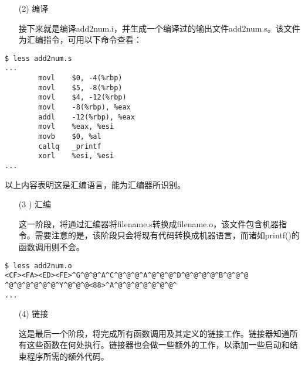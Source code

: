 \begin{frame}[fragile]\ft{\secname}
\begin{itemize}
\item[(2)] 编译
\item[] 接下来就是编译{\ttfamily add2num.i}，并生成一个编译过的输出文件{\ttfamily add2num.s}。该文件为汇编指令，可用以下命令查看：
\end{itemize}
\end{frame}


\begin{frame}[fragile]\ft{\secname}
\begin{lstlisting}[basicstyle=\ttfamily\footnotesize,backgroundcolor=\color{red!10}]
$ less add2num.s
...
        movl    $0, -4(%rbp)
        movl    $5, -8(%rbp)
        movl    $4, -12(%rbp)
        movl    -8(%rbp), %eax
        addl    -12(%rbp), %eax
        movl    %eax, %esi
        movb    $0, %al
        callq   _printf
        xorl    %esi, %esi
...      
\end{lstlisting}
以上内容表明这是汇编语言，能为汇编器所识别。
\end{frame}


\begin{frame}[fragile]\ft{\secname}
\begin{itemize}
\item[(3 )] 汇编
\item[] 这一阶段，将通过汇编器将{\ttfamily filename.s}转换成{\ttfamily filename.o}，该文件包含机器指令。需要注意的是，该阶段只会将现有代码转换成机器语言，而诸如{\ttfamily printf()}的函数调用则不会。
\end{itemize}
\end{frame}


\begin{frame}[fragile]\ft{\secname}
\begin{lstlisting}[backgroundcolor=\color{red!10}]
$ less add2num.o
<CF><FA><ED><FE>^G^@^@^A^C^@^@^@^A^@^@^@^D^@^@^@^@^B^@^@^@ ^@^@^@^@^@^@^Y^@^@^@<88>^A^@^@^@^@^@^@^@^
...      
\end{lstlisting}

\end{frame}


\begin{frame}[fragile]\ft{\secname}
\begin{itemize}
\item[(4)] 链接
\item[] 
这是最后一个阶段，将完成所有函数调用及其定义的链接工作。链接器知道所有这些函数在何处执行。链接器也会做一些额外的工作，以添加一些启动和结束程序所需的额外代码。 
\end{itemize}
\end{frame}


